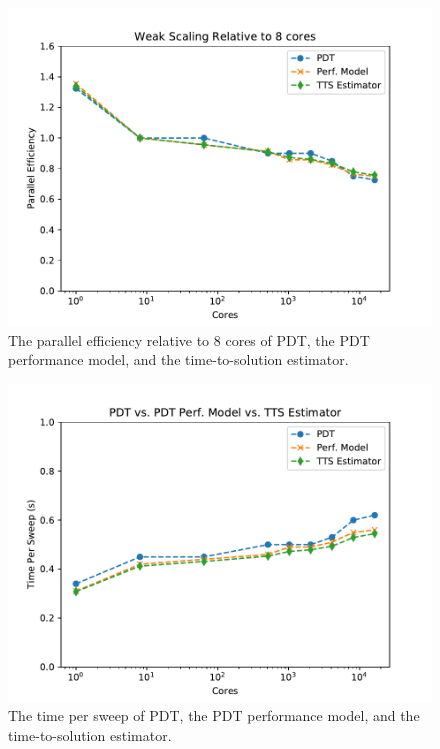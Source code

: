 \begin{figure}[H]
\centering
\includegraphics{../../figures/scaling_tts.pdf}
\caption{The parallel efficiency relative to 8 cores of PDT, the PDT performance model, and the time-to-solution estimator.}
\label{weak_scaling_tts}
\end{figure}

\begin{figure}[H]
\centering
\includegraphics{../../figures/scaling_tts_sweep_times.pdf}
\caption{The time per sweep of PDT, the PDT performance model, and the time-to-solution estimator.}
\label{weak_scaling_tts_sweep}
\end{figure}



